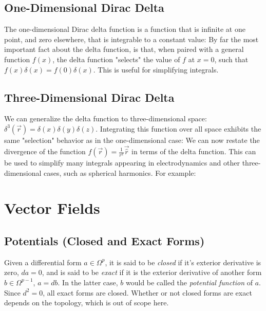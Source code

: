 \subsection{One-Dimensional Dirac Delta}
The one-dimensional Dirac delta function is a function that is infinite at one point, and zero elsewhere, that is integrable to a constant value:
By far the most important fact about the delta function, is that, when paired with a general function $f(x)$, the delta function "selects" the value of $f$ at $x=0$, such that $f(x)\delta(x) = f(0)\delta(x)$. This is useful for simplifying integrals. 
\subsection{Three-Dimensional Dirac Delta}
We can generalize the delta function to three-dimensional space: $\delta^3(\vec{r})=\delta(x)\delta(y)\delta(z)$. Integrating this function over all space exhibits the same "selection" behavior as in the one-dimensional case:
We can now restate the divergence of the function $f(\vec{r})=\frac{1}{r^2}\vec{\hat{r}}$ in terms of the delta function. 
This can be used to simplify many integrals appearing in electrodynamics and other three-dimensional cases, such as spherical harmonics. For example:


\newpage
\section{Vector Fields}
\label{app:vector-analysis:potentials}
\subsection{Potentials (Closed and Exact Forms)}
Given a differential form $a\in \Omega^p$, it is said to be \textit{closed} if it's exterior derivative is zero, $da=0$, and is said to be \textit{exact} if it is the exterior derivative of another form $b \in \Omega^{p-1}$, $a = db$. In the latter case, $b$ would be called the \textit{potential function} of $a$. Since $d^2=0$, all exact forms are closed. Whether or not closed forms are exact depends on the topology, which is out of scope here. 

